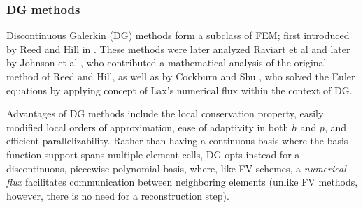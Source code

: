 \subsubsection{DG methods}

Discontinuous Galerkin (DG) methods form a subclass of FEM; first introduced by Reed and Hill in \cite{Reed:73}. These methods were later analyzed Raviart et al \cite{DGRaviart} and later by Johnson et al \cite{DGJohnson}, who contributed a mathematical analysis of the original method of Reed and Hill, as well as by Cockburn and Shu \cite{CockburnShu:DG}, who solved the Euler equations by applying concept of Lax's numerical flux within the context of DG.

Advantages of DG methods include the local conservation property, easily modified local orders of approximation, ease of adaptivity in both $h$ and $p$, and efficient parallelizability. Rather than having a continuous basis where the basis function support spans multiple element cells, DG opts instead for a discontinuous, piecewise polynomial basis, where, like FV schemes, a \emph{numerical flux} facilitates communication between neighboring elements (unlike FV methods, however, there is no need for a reconstruction step). 

